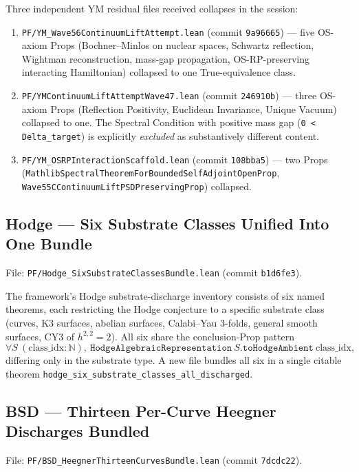 Three independent YM residual files received collapses in the session:
\begin{enumerate}
  \item \texttt{PF/YM\_Wave56ContinuumLiftAttempt.lean} (commit
    \texttt{9a96665}) --- five OS-axiom Props (Bochner--Minlos on
    nuclear spaces, Schwartz reflection, Wightman reconstruction,
    mass-gap propagation, OS-RP-preserving interacting Hamiltonian)
    collapsed to one True-equivalence class.
  \item \texttt{PF/YMContinuumLiftAttemptWave47.lean} (commit
    \texttt{246910b}) --- three OS-axiom Props (Reflection Positivity,
    Euclidean Invariance, Unique Vacuum) collapsed to one. The
    Spectral Condition with positive mass gap (\verb|0 < Delta_target|)
    is explicitly \emph{excluded} as substantively different content.
  \item \texttt{PF/YM\_OSRPInteractionScaffold.lean} (commit
    \texttt{108bba5}) --- two Props
    (\verb|MathlibSpectralTheoremForBoundedSelfAdjointOpenProp|,
    \verb|Wave55CContinuumLiftPSDPreservingProp|) collapsed.
\end{enumerate}

\subsection{Hodge --- Six Substrate Classes Unified Into One Bundle}
\label{subsec:residual-hodge}

File: \texttt{PF/Hodge\_SixSubstrateClassesBundle.lean} (commit
\texttt{b1d6fe3}).

The framework's Hodge substrate-discharge inventory consists of six
named theorems, each restricting the Hodge conjecture to a specific
substrate class (curves, K3 surfaces, abelian surfaces, Calabi--Yau
3-folds, general smooth surfaces, CY3 of $h^{2,2}=2$). All six share
the conclusion-Prop pattern
\[
\forall S\ (\mathrm{class\_idx} : \mathbb{N}),\
  \mathtt{HodgeAlgebraicRepresentation}\ S.\mathtt{toHodgeAmbient}\ \mathrm{class\_idx},
\]
differing only in the substrate type. A new file bundles all six in
a single citable theorem
\verb|hodge_six_substrate_classes_all_discharged|.

\subsection{BSD --- Thirteen Per-Curve Heegner Discharges Bundled}
\label{subsec:residual-bsd-13curves}

File: \texttt{PF/BSD\_HeegnerThirteenCurvesBundle.lean} (commit
\texttt{7dcdc22}).

